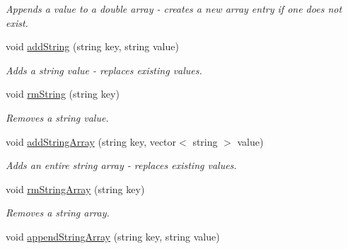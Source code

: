 \begin{DoxyCompactItemize}
\begin{DoxyCompactList}\small\item\em Appends a value to a double array -\/ creates a new array entry if one does not exist. \end{DoxyCompactList}\item 
\hypertarget{class_rules_1_1_rules_entry_a54d9e1b96c7a511ac173049aa735452e}{void \hyperlink{class_rules_1_1_rules_entry_a54d9e1b96c7a511ac173049aa735452e}{add\-String} (string key, string value)}\label{class_rules_1_1_rules_entry_a54d9e1b96c7a511ac173049aa735452e}

\begin{DoxyCompactList}\small\item\em Adds a string value -\/ replaces existing values. \end{DoxyCompactList}\item 
\hypertarget{class_rules_1_1_rules_entry_aac476c6c5065e5740d72a27319196149}{void \hyperlink{class_rules_1_1_rules_entry_aac476c6c5065e5740d72a27319196149}{rm\-String} (string key)}\label{class_rules_1_1_rules_entry_aac476c6c5065e5740d72a27319196149}

\begin{DoxyCompactList}\small\item\em Removes a string value. \end{DoxyCompactList}\item 
\hypertarget{class_rules_1_1_rules_entry_a1749c6a8321f7d98f8712a56daf8451e}{void \hyperlink{class_rules_1_1_rules_entry_a1749c6a8321f7d98f8712a56daf8451e}{add\-String\-Array} (string key, vector$<$ string $>$ value)}\label{class_rules_1_1_rules_entry_a1749c6a8321f7d98f8712a56daf8451e}

\begin{DoxyCompactList}\small\item\em Adds an entire string array -\/ replaces existing values. \end{DoxyCompactList}\item 
\hypertarget{class_rules_1_1_rules_entry_aa28aecf54850e819b1eaca9d7952db2b}{void \hyperlink{class_rules_1_1_rules_entry_aa28aecf54850e819b1eaca9d7952db2b}{rm\-String\-Array} (string key)}\label{class_rules_1_1_rules_entry_aa28aecf54850e819b1eaca9d7952db2b}

\begin{DoxyCompactList}\small\item\em Removes a string array. \end{DoxyCompactList}\item 
\hypertarget{class_rules_1_1_rules_entry_a01e2ab54e4ebf9c3129abcc67ee31110}{void \hyperlink{class_rules_1_1_rules_entry_a01e2ab54e4ebf9c3129abcc67ee31110}{append\-String\-Array} (string key, string value)}\label{class_rules_1_1_rules_entry_a01e2ab54e4ebf9c3129abcc67ee31110}


\end{DoxyCompactItemize}
